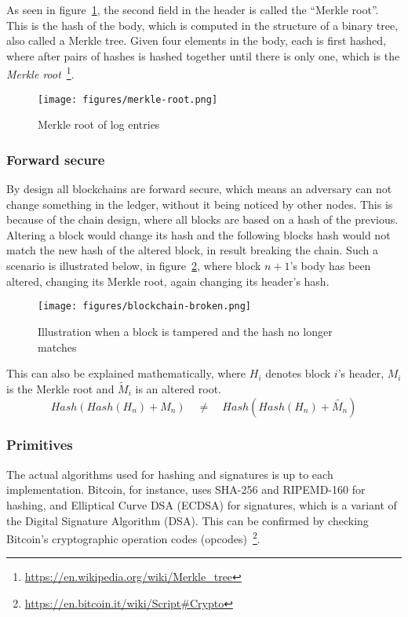 As seen in figure~\ref{fig:merkle-root}, the second field in the
header is called the ``Merkle root''. This is the hash of the body,
which is computed in the structure of a binary tree, also called a
Merkle tree. Given four elements in the body, each is first hashed,
where after pairs of hashes is hashed together until there is only
one, which is the \textit{Merkle
  root}~\footnote{\url{https://en.wikipedia.org/wiki/Merkle_tree}}.
\begin{figure}[H]
  \centering
  \texttt{[image: figures/merkle-root.png]}
  \caption{\label{fig:merkle-root} Merkle root of log entries}
\end{figure}

\subsubsection{Forward secure}
\label{sec:block-forward-secure}
By design all blockchains are forward secure, which means an adversary
can not change something in the ledger, without it being noticed by
other nodes. This is because of the chain design, where all blocks are
based on a hash of the previous. Altering a block would change its
hash and the following blocks hash would not match the new hash of the
altered block, in result breaking the chain. Such a scenario is
illustrated below, in figure~\ref{fig:blockchain-broken}, where block
$n+1$'s body has been altered, changing its Merkle root, again
changing its header's hash.
\begin{figure}[ht]
  \centering
  \texttt{[image: figures/blockchain-broken.png]}
  \caption{\label{fig:blockchain-broken} Illustration when a block is
    tampered and the hash no longer matches}
\end{figure}

This can also be explained mathematically, where $H_i$ denotes block
$i$'s header, $M_i$ is the Merkle root and $\widetilde{M}_i$
is an altered root.
\begin{equation}
Hash(Hash(H_n) + M_n) \quad\neq\quad Hash(Hash(H_n) + \widetilde{M_n})
\end{equation}

\subsubsection{Primitives}
\label{sec:block-crypto-prims}
The actual algorithms used for hashing and signatures is up to each
implementation. Bitcoin, for instance, uses SHA-256 and RIPEMD-160 for
hashing, and Elliptical Curve DSA (ECDSA) for signatures, which is a
variant of the Digital Signature Algorithm (DSA). This can be
confirmed by checking Bitcoin's cryptographic operation codes
(opcodes)~\footnote{\url{https://en.bitcoin.it/wiki/Script\#Crypto}}.

